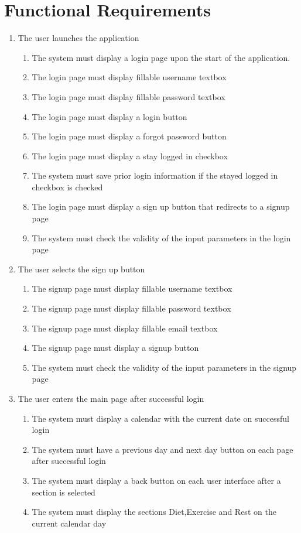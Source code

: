 \documentclass[12pt,letterpaper]{article}
\begin{document}
\section{Functional Requirements}
\begin{enumerate}[{BE}1.] 
\item The user launches the application
\begin{enumerate}[{FR}1.]
	\item  The system must display a login page upon the start of the application.
	\item  The login page must display fillable username textbox
	\item  The login page must display fillable password textbox
	\item  The login page must display a login button
	\item  The login page must display a forgot password button
	\item  The login page must display a stay logged in checkbox
	\item  The system must save prior login information if the stayed logged in checkbox is checked
	\item  The login page must display a sign up button that redirects to a signup page
	\item  The system must check the validity of the input parameters in the login page
\end{enumerate}

\item The user selects the sign up button
\begin{enumerate}[resume*]
	\item  The signup page must display fillable username textbox
	\item  The signup page must display fillable password textbox
	\item  The signup page must display fillable email textbox
	\item  The signup page must display a signup button
	\item  The system must check the validity of the input parameters in the signup page
\end{enumerate}

\item The user enters the main page after successful login
\begin{enumerate}[resume*]
	\item  The system must display a calendar with the current date on successful login
	\item  The system must have a previous day and next day button on each page after successful login
	\item  The system must display a back button on each user interface after a section is selected
	\item  The system must display the sections Diet,Exercise and Rest on the current calendar day
\end{enumerate}


\end{enumerate}
\end{document}
